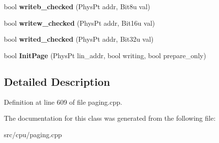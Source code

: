 \begin{DoxyCompactItemize}
\item 
\hypertarget{classNewInitPageHandler_a0c035c65067785ecc7e5ecbccf537dac}{bool {\bfseries writeb\-\_\-checked} (Phys\-Pt addr, Bit8u val)}\label{classNewInitPageHandler_a0c035c65067785ecc7e5ecbccf537dac}

\item 
\hypertarget{classNewInitPageHandler_a003e3785c9a35bd84bae3ed162ae56d5}{bool {\bfseries writew\-\_\-checked} (Phys\-Pt addr, Bit16u val)}\label{classNewInitPageHandler_a003e3785c9a35bd84bae3ed162ae56d5}

\item 
\hypertarget{classNewInitPageHandler_a957e5fdb0fd091b74c1f2c1bf9456f8a}{bool {\bfseries writed\-\_\-checked} (Phys\-Pt addr, Bit32u val)}\label{classNewInitPageHandler_a957e5fdb0fd091b74c1f2c1bf9456f8a}

\item 
\hypertarget{classNewInitPageHandler_a1ed4fb6bc908d2a5b4a8c0b486be0852}{bool {\bfseries Init\-Page} (Phys\-Pt lin\-\_\-addr, bool writing, bool prepare\-\_\-only)}\label{classNewInitPageHandler_a1ed4fb6bc908d2a5b4a8c0b486be0852}

\end{DoxyCompactItemize}


\subsection{Detailed Description}


Definition at line 609 of file paging.\-cpp.



The documentation for this class was generated from the following file\-:\begin{DoxyCompactItemize}
\item 
src/cpu/paging.\-cpp\end{DoxyCompactItemize}
